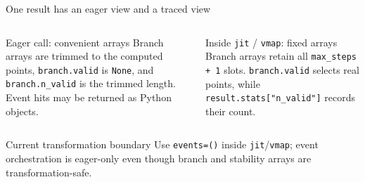 \begin{frame}{One result has an eager view and a traced view}
\begin{columns}[T]
\begin{block}{Eager call: convenient arrays}
Branch arrays are trimmed to the computed points, \texttt{branch.valid} is
\texttt{None}, and \texttt{branch.n\_valid} is the trimmed length. Event hits
may be returned as Python objects.
\end{block}
\begin{block}{Inside \texttt{jit} / \texttt{vmap}: fixed arrays}
Branch arrays retain all \texttt{max\_steps + 1} slots.
\texttt{branch.valid} selects real points, while
\texttt{result.stats["n\_valid"]} records their count.
\end{block}
\end{columns}
\vspace{4mm}
\begin{center}
\end{center}
\begin{alertblock}{Current transformation boundary}
Use \texttt{events=()} inside \texttt{jit}/\texttt{vmap}; event orchestration is
eager-only even though branch and stability arrays are transformation-safe.
\end{alertblock}
\end{frame}

